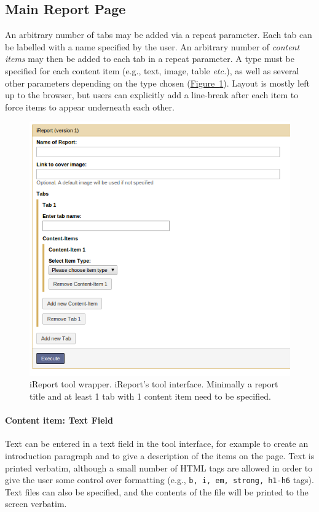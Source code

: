 \subsection*{Main Report Page}
An arbitrary number of tabs may be added via a repeat parameter. Each tab can be labelled with a name specified by the user. An arbitrary number of \emph{content items} may then be added to each tab in a repeat parameter. A type must be specified for each content item (e.g., text, image, table \emph{etc.}), as well as several other parameters depending on the type chosen (\hyperref[fig:wrapper]{Figure~\ref*{fig:wrapper}}). Layout is mostly left up to the browser, but users can explicitly add a line-break after each item to force items to appear underneath each other.

\begin{figure}[h!]
    \centering
    \includegraphics[scale=0.5]{chapters/images/iReport/Hiltemann_wrapper.jpg}
    \caption{iReport tool wrapper. iReport's tool interface. Minimally a report title and at least 1 tab with 1 content item need to be specified.}
    \label{fig:wrapper}
\end{figure}

\paragraph*{Content item: Text Field}
Text can be entered in a text field in the tool interface, for example to create an introduction paragraph and to give a description of the items on the page. Text is printed verbatim, although a small number of HTML tags are allowed in order to give the user some control over formatting (e.g., \verb+b, i, em, strong, h1-h6+ tags). Text files can also be specified, and the contents of the file will be printed to the screen verbatim.

